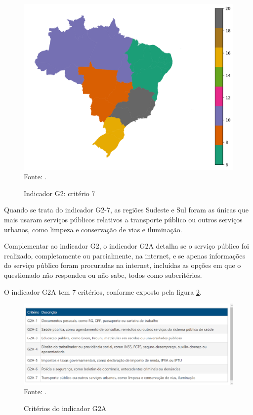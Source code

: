 \begin{figure}[H]
	\centering
	\caption{Indicador G2: critério 7}
	\includegraphics[width=1\linewidth]{figuras/mapa_coropletico_tic_domicilios_2024_g2_7.png}
	\label{fig:mapa_coropletico_tic_domicilios_2024_g2_7}
	\footnotesize{Fonte: \cite{tic_domicilios_2024_g2}.}
\end{figure}

Quando se trata do indicador G2-7, as regiões Sudeste e Sul foram as únicas que mais usaram serviços públicos relativos a transporte público ou outros serviços urbanos, como limpeza e conservação de vias e iluminação.

Complementar ao indicador G2, o indicador G2A detalha se o serviço público foi realizado, completamente ou parcialmente, na internet, e se apenas informações do serviço público foram procuradas na internet, incluídas as opções em que o questionado não respondeu ou não sabe, todos como subcritérios. 

O indicador G2A tem 7 critérios, conforme exposto pela figura \ref{fig:tabela_tic_domicilios_2024_criterios_g2a}.

\begin{figure}[H]
	\centering
	\caption{Critérios do indicador G2A}
	\includegraphics[width=1\linewidth]{figuras/tabela_tic_domicilios_2024_criterios_g2a.png}
	\label{fig:tabela_tic_domicilios_2024_criterios_g2a}
	\footnotesize{Fonte: \cite{tic_domicilios_2024_g2a}.}
\end{figure}

